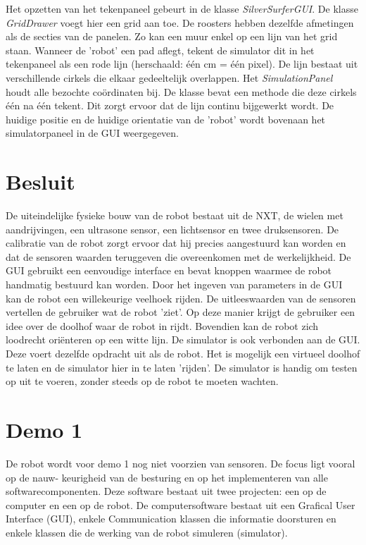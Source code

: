 \documentclass[tt3]{penoverslag}
\begin{document}
Het opzetten van het tekenpaneel gebeurt in de klasse \textit{SilverSurferGUI}. De klasse \textit{GridDrawer} voegt hier een grid aan toe. De roosters hebben dezelfde afmetingen als de secties van de panelen. Zo kan een muur enkel op een lijn van het grid staan.
Wanneer de 'robot' een pad aflegt, tekent de simulator dit in het tekenpaneel als een rode lijn (herschaald: \'e\'en cm = \'e\'en pixel). De lijn  bestaat uit verschillende cirkels die elkaar gedeeltelijk overlappen. Het \textit{SimulationPanel} houdt alle bezochte co\"ordinaten bij. De klasse bevat een methode die deze cirkels \'e\'en na \'e\'en tekent. Dit zorgt ervoor dat de lijn continu bijgewerkt wordt. De huidige positie en de huidige orientatie van de 'robot' wordt bovenaan het simulatorpaneel in de GUI weergegeven.

\section{Besluit} %
\label{sec:besl}
De uiteindelijke fysieke bouw van de robot bestaat uit de NXT, de wielen met aandrijvingen, een ultrasone sensor, een lichtsensor en twee druksensoren.
De calibratie van de robot zorgt ervoor dat hij precies aangestuurd kan worden en dat de sensoren waarden teruggeven die overeenkomen met de werkelijkheid.
De GUI gebruikt een eenvoudige interface en bevat knoppen waarmee de robot handmatig bestuurd kan worden. Door het ingeven van parameters in de GUI kan de robot een willekeurige veelhoek rijden. De uitleeswaarden van de sensoren vertellen de gebruiker wat de robot 'ziet'. Op deze manier krijgt de gebruiker een idee over de doolhof waar de robot in rijdt. Bovendien kan de robot zich loodrecht ori\"enteren op een witte lijn. De simulator is ook verbonden aan de GUI. Deze voert dezelfde opdracht uit als de robot. Het is mogelijk een virtueel doolhof te laten en de simulator hier in te laten 'rijden'. De simulator is handig om testen op uit te voeren, zonder steeds op de robot te moeten wachten.


\newpage
\makeappendix

\section{Demo 1} %
\label{Asec:demo1}
De robot wordt voor demo 1 nog niet voorzien van sensoren. De focus ligt vooral op de nauw-
keurigheid van de besturing en op het implementeren van alle softwarecomponenten. Deze software
bestaat uit twee projecten: een op de computer en een op de robot. De computersoftware bestaat
uit een Grafical User Interface (GUI), enkele Communication klassen die informatie doorsturen en
enkele klassen die de werking van de robot simuleren (simulator).
\end{document}
